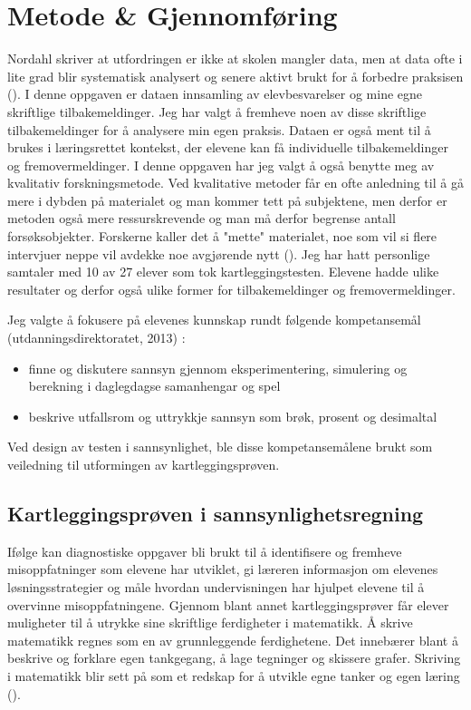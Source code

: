 \documentclass[main.tex]{subfiles}
\begin{document}
\section*{Metode \& Gjennomføring}
\label{sec:2}

Nordahl skriver at utfordringen er ikke at skolen mangler data, men at data ofte i lite grad blir
systematisk analysert og senere aktivt brukt for å forbedre praksisen ().
I denne oppgaven er dataen innsamling av elevbesvarelser og mine egne skriftlige tilbakemeldinger.
Jeg har valgt å fremheve noen av disse skriftlige tilbakemeldinger for å analysere min egen praksis.
Dataen er også ment til å brukes i læringsrettet kontekst, der elevene kan få
individuelle tilbakemeldinger og fremovermeldinger. 
\newline
\newline
I denne oppgaven har jeg valgt å også benytte meg av kvalitativ forskningsmetode. Ved
kvalitative metoder får en ofte anledning til å gå mere i dybden på materialet og man kommer
tett på subjektene, men derfor er metoden også mere ressurskrevende og man må derfor
begrense antall forsøksobjekter. Forskerne kaller det å "mette" materialet, noe som vil si 
flere intervjuer neppe vil avdekke noe avgjørende nytt (). Jeg har hatt
personlige samtaler med 10 av 27 elever som tok kartleggingstesten. Elevene hadde ulike
resultater og derfor også ulike former for tilbakemeldinger og fremovermeldinger.

Jeg valgte å fokusere på elevenes kunnskap rundt følgende kompetansemål (utdanningsdirektoratet, 2013) :
\begin{itemize}
\item finne og diskutere sannsyn gjennom eksperimentering, simulering og berekning i daglegdagse samanhengar og spel
\item beskrive utfallsrom og uttrykkje sannsyn som brøk, prosent og desimaltal
\end{itemize}
Ved design av testen i sannsynlighet, ble disse kompetansemålene brukt som veiledning til
utformingen av kartleggingsprøven.

\subsection*{Kartleggingsprøven i sannsynlighetsregning}

Ifølge  kan diagnostiske oppgaver bli brukt til å identifisere og fremheve misoppfatninger 
som elevene har utviklet, gi læreren informasjon om elevenes løsningsstrategier og måle hvordan undervisningen 
har hjulpet elevene til å overvinne misoppfatningene. Gjennom blant annet kartleggingsprøver får elever muligheter
til å utrykke sine skriftlige ferdigheter i matematikk. Å skrive matematikk regnes som en av grunnleggende 
ferdighetene. Det innebærer blant å beskrive og forklare egen tankgegang, å lage tegninger og skissere grafer. 
Skriving i matematikk blir sett på som et redskap for å utvikle egne tanker og egen læring (). 
\end{document}
